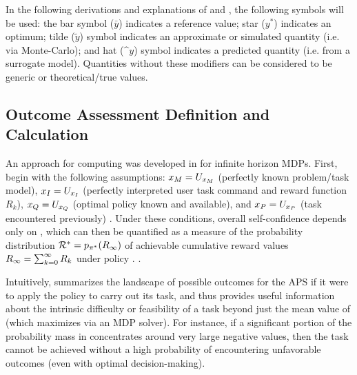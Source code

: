  In the following derivations and explanations of \xO{} and \xQ{}, the following symbols will be used: the bar symbol ($\bar{y}$) indicates a reference value; star ($y^*$) indicates an optimum; tilde ($\tilde{y}$) symbol indicates an approximate or simulated quantity (i.e. via Monte-Carlo); and hat ($\^{y}$) symbol indicates a predicted quantity (i.e. from a surrogate model). Quantities without these modifiers can be considered to be generic or theoretical/true values.

\subsection{Outcome Assessment Definition and Calculation} \label{sec:xO}
An approach for computing \xO{} was developed in \cite{Aitken2016-cv} for infinite horizon MDPs. First, begin with the following assumptions: $x_M=U_{x_M}$ (perfectly known problem/task model), $x_I= U_{x_I}$ (perfectly interpreted user task command and reward function $R_k$), $x_Q=U_{x_Q}$ (optimal policy \piopt{} known and available), and $x_P=U_{x_P}$ (task encountered previously) . Under these conditions, overall self-confidence depends only on \xO{}, which can then be quantified as a measure of the probability distribution  $\mathcal{R}^* = p_{\pi^*}(R_{\infty})$ of achievable  cumulative reward values $R_{\infty}= \sum_{k=0}^{\infty}R_{k}$ under policy \piopt. . 

 Intuitively, \rwdopt{} summarizes the landscape of possible outcomes for the APS if it were to apply the policy \piopt{} to carry out its task, and thus provides useful information about the intrinsic difficulty or feasibility of a task beyond just the mean value of \ri{} (which \piopt{} maximizes via an MDP solver). For instance, if a significant portion of the probability mass in \rwdopt{} concentrates around very large negative values, then the task cannot be achieved without a high probability of encountering unfavorable outcomes (even with optimal decision-making). 

